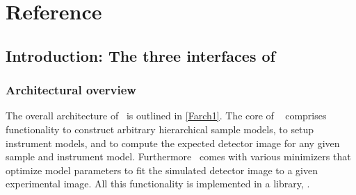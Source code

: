 
\part{Reference}\label{PREF}

\chapter{Introduction: The three interfaces of \BornAgain}  \label{sec:API3}

\section{Architectural overview}

The overall architecture of \BornAgain\ is outlined in \cref{Farch1}.
The core of \BornAgain\
comprises functionality to construct arbitrary hierarchical sample models,
to setup instrument models,
and to compute the expected detector image for any given sample and instrument model.
Furthermore \BornAgain\ comes with various minimizers that optimize model parameters
to fit the simulated detector image to a given experimental image.
All this functionality is implemented in a library, .

